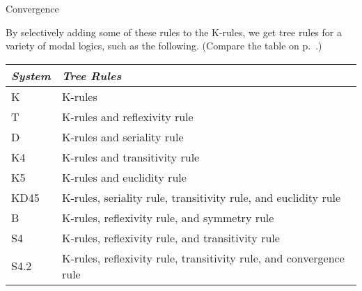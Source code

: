 \begin{center}
\begin{minipage}[t]{0.3\textwidth}
    \medskip

  \end{minipage}
  \begin{minipage}[t]{0.3\textwidth} \centering
    Convergence
    
    \medskip

  \end{minipage}

\end{center}

By selectively adding some of these rules to the K-rules, we get tree rules for
a variety of modal logics, such as the following.  (Compare the table on p.\
\pageref{table:systems}.)

\bigskip
\begin{tabular}{ll}
  \toprule
  \emph{System} & \emph{Tree Rules}\\
  \midrule
  K & K-rules\\
  T & K-rules and reflexivity rule\\
  D & K-rules and seriality rule\\
  K4 & K-rules and transitivity rule\\
  K5 & K-rules and euclidity rule\\
  KD45 & K-rules, seriality rule, transitivity rule, and euclidity rule\\
  B & K-rules, reflexivity rule, and symmetry rule\\
  S4 & K-rules, reflexivity rule, and transitivity rule\\ 
  S4.2 & K-rules, reflexivity rule, transitivity rule, and convergence rule\\
  \bottomrule
\end{tabular}
\bigskip

